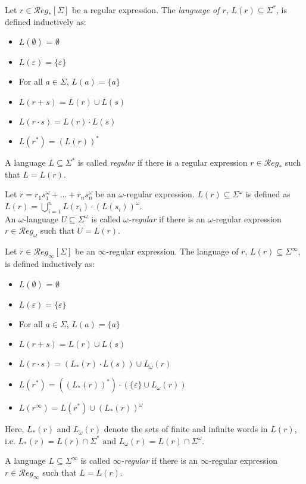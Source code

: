 \begin{defn}
	Let $r \in \mathcal{R}eg_*[\Sigma]$ be a regular expression. The \emph{language of $r$}, $L(r) \subseteq \Sigma^*$, is defined inductively as:
	\begin{itemize}
		\item $L(\emptyset)$ = $\emptyset$
		\item $L(\varepsilon) = \{\varepsilon\}$
		\item For all $a \in \Sigma$, $L(a) = \{a\}$
		\item $L(r + s) = L(r) \cup L(s)$
		\item $L(r \cdot s) = L(r) \cdot L(s)$
		\item $L(r^*) = (L(r))^*$
	\end{itemize}
	
	A language $L \subseteq \Sigma^*$ is called \emph{regular} if there is a regular expression $r \in \mathcal{R}eg_*$ such that $L = L(r)$.
\end{defn}

\begin{defn}
	Let $r = r_1 s_1^\omega + \dots + r_n s_n^\omega$ be an $\omega$-regular expression. $L(r) \subseteq \Sigma^\omega$ is defined as $L(r) = \bigcup\limits_{i=1}^n L(r_i) \cdot (L(s_i))^\omega$.\\
	An $\omega$-language $U \subseteq \Sigma^\omega$ is called \emph{$\omega$-regular} if there is an $\omega$-regular expression $r \in \mathcal{R}eg_\omega$ such that $U = L(r)$.
\end{defn}

\begin{defn}
	Let $r \in \mathcal{R}eg_\infty[\Sigma]$ be an $\infty$-regular expression. The language of $r$, $L(r) \subseteq \Sigma^\infty$, is defined inductively as:
	\begin{itemize}
		\item $L(\emptyset)$ = $\emptyset$
		\item $L(\varepsilon) = \{\varepsilon\}$
		\item For all $a \in \Sigma$, $L(a) = \{a\}$
		\item $L(r + s) = L(r) \cup L(s)$
		\item $L(r \cdot s) = (L_*(r) \cdot L(s)) \cup L_\omega(r)$
		\item $L(r^*) = ((L_*(r))^*) \cdot (\{\varepsilon\} \cup L_\omega(r))$
		\item $L(r^\infty) = L(r^*) \cup (L_*(r))^\omega$
	\end{itemize}
	Here, $L_*(r)$ and $L_\omega(r)$ denote the sets of finite and infinite words in $L(r)$, i.e. $L_*(r) = L(r) \cap \Sigma^*$ and $L_\omega(r) = L(r) \cap \Sigma^\omega$.
	
	A language $L \subseteq \Sigma^\infty$ is called \emph{$\infty$-regular} if there is an $\infty$-regular expression $r \in \mathcal{R}eg_\infty$ such that $L = L(r)$.
\end{defn}

